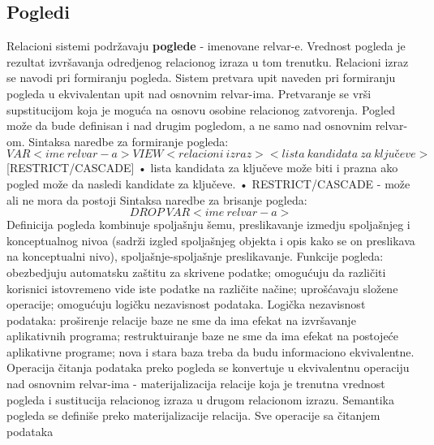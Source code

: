 \documentclass{article}
\begin{document}
\subsection{Pogledi}
Relacioni sistemi podržavaju \textbf{poglede} - imenovane relvar-e.
Vrednost pogleda je rezultat izvršavanja odredjenog relacionog 
izraza u tom trenutku. Relacioni izraz se navodi pri formiranju 
pogleda. Sistem pretvara upit naveden pri formiranju pogleda u 
ekvivalentan upit nad osnovnim relvar-ima. Pretvaranje se vrši 
supstitucijom koja je moguća na osnovu osobine relacionog 
zatvorenja. Pogled može da bude definisan i nad drugim pogledom, a 
ne samo nad osnovnim relvar-om.
\newline
Sintaksa naredbe za formiranje pogleda:
\newline
$$VAR <ime\ relvar-a> VIEW <relacioni\ izraz> <lista\ kandidata\ za\
ključeve>$$[RESTRICT/CASCADE]
\vspace{0.2cm} \newline • lista kandidata za ključeve može biti i
prazna ako pogled može da nasledi kandidate za ključeve.
\newline • RESTRICT/CASCADE - može ali ne mora da postoji
\vspace{0.2cm} \newline
Sintaksa naredbe za brisanje pogleda:
$$DROP\ VAR <ime\ relvar-a>$$
Definicija pogleda kombinuje spoljašnju šemu, preslikavanje izmedju
spoljašnjeg i konceptualnog nivoa (sadrži izgled spoljašnjeg objekta
i opis kako se on preslikava na konceptualni nivo),
spoljašnje-spoljašnje preslikavanje.
\vspace{0.2cm} \newline
Funkcije pogleda: obezbedjuju automatsku zaštitu za skrivene
podatke; omogućuju da različiti korisnici istovremeno vide iste
podatke na različite načine; uprošćavaju složene operacije;
omogućuju logičku nezavisnost podataka.
\newline
Logička nezavisnost podataka: proširenje relacije baze ne sme da ima
efekat na izvršavanje aplikativnih programa; restruktuiranje baze ne
sme da ima efekat na postojeće aplikativne programe; nova i stara
baza treba da budu informaciono ekvivalentne.
\vspace{0.2cm} \newline
Operacija čitanja podataka preko pogleda se konvertuje u
ekvivalentnu operaciju nad osnovnim relvar-ima - materijalizacija
relacije koja je trenutna vrednost pogleda i sustitucija relacionog
izraza u drugom relacionom izrazu. Semantika pogleda se definiše
preko materijalizacije relacija. Sve operacije sa čitanjem podataka
\end{document}
